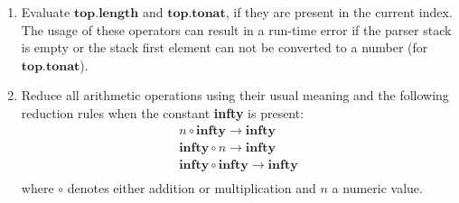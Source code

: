 \documentclass[sigplan,screen]{acmart}
\theoremstyle{definition}
\begin{document}
\begin{enumerate}
  \item Evaluate $\mathbf{top.length}$ and $\mathbf{top.tonat}$, if
    they are present in the current index. The usage of these operators
    can result in a run-time error if the parser stack is empty or the
    stack first element can not be converted to a number (for $\mathbf{top.tonat}$).
  \item Reduce all arithmetic operations using their usual meaning and
    the following reduction rules
    when the constant \textbf{infty} is present:
\[
  \begin{array}{c}
    n \circ \mathbf{infty} \rightarrow \mathbf{infty}\\
    \mathbf{infty}\circ n \rightarrow \mathbf{infty}\\
    \mathbf{infty}\circ\mathbf{infty} \rightarrow \mathbf{infty}\\
  \end{array}
\]
where $\circ$ denotes either addition or multiplication and $n$ a
numeric value.
\end{enumerate}
\end{document}
